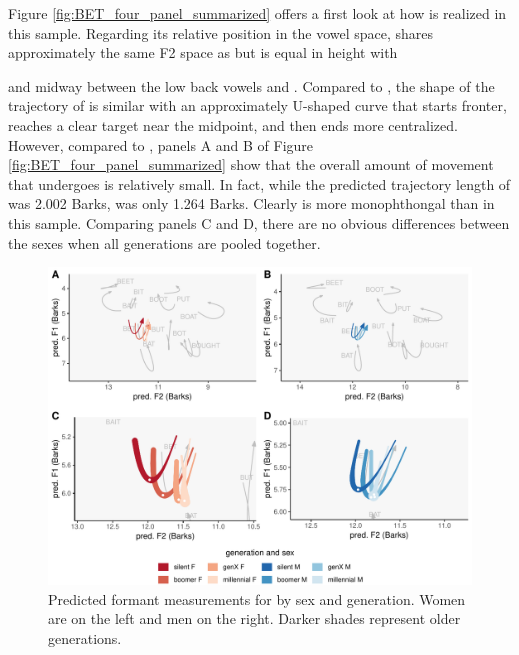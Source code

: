 Figure \ref{fig:BET_four_panel_summarized} offers a first look at how \bet is realized in this sample. Regarding its relative position in the vowel space, \bet shares approximately the same F2 space as \bat but is equal in height with \strut and midway between the low back vowels and \goat. Compared to \bat, the shape of the trajectory of \bet is similar with an approximately U-shaped curve that starts fronter, reaches a clear target near the midpoint, and then ends more centralized. However, compared to \bat, panels A and B of Figure \ref{fig:BET_four_panel_summarized} show that the overall amount of movement that \bet undergoes is relatively small. In fact, while the predicted trajectory length of \bat was 2.002 Barks, \bet was only 1.264 Barks. Clearly \bet is more monophthongal than \bat in this sample. Comparing panels C and D, there are no obvious differences between the sexes when all generations are pooled together.

\begin{figure}[tb!]
	\centering
	\includegraphics[width = 6.5in]{Figures/BET/BET_four_panel_plot.pdf}
	\caption[Predicted formant measurements for \bet by sex and generation.]{Predicted formant measurements for \bet by sex and generation. Women are on the left and men on the right. Darker shades represent older generations.}
	\label{fig:BET_four_panel}
\end{figure}

